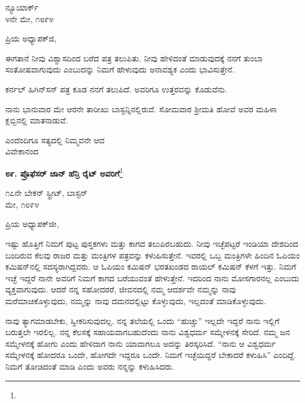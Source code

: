 \begin{flushright}
ನ್ಯೂಯಾರ್ಕ್\\೪ನೇ ಮೇ, ೧೮೯೪
\end{flushright}
\vspace{-0.5cm}

\noindent
ಪ್ರಿಯ ಅಧ್ಯಾಪಕ್‌ಜಿ,

ಈಗತಾನೆ ನೀವು ವಿಶ್ವಾಸದಿಂದ ಬರೆದ ಪತ್ರ ತಲುಪಿತು. ನೀವು ಹೇಳಿದಂತೆ ಮಾಡುವುದಕ್ಕೆ ನನಗೆ ತುಂಬಾ ಸಂತೋಷವಾಗುವುದು ಎಂಬುದನ್ನು ನಿಮಗೆ ಹೇಳುವುದು ಅನಾವಶ್ಯಕ ಎಂದು ಭಾವಿಸುತ್ತೇನೆ.

ಕರ್ನಲ್ ಹಿಗಿನ್‌ಸನ್ ಪತ್ರ ಕೂಡ ನನಗೆ ತಲುಪಿದೆ. ಅವರಿಗೂ ಉತ್ತರವನ್ನು ಕೊಡುವೆನು.

ನಾನು ಭಾನುವಾರ ಮೇ ಆರನೇ ತಾರೀಖು ಬಾಸ್ಟನ್ನಿನಲ್ಲಿರುವೆ. ಸೋಮವಾರ ಶ‍್ರೀಮತಿ ಹೋವೆ ಅವರ ಮಹಿಳಾ ಕ್ಲಬ್ಬಿನಲ್ಲಿ ಮಾತನಾಡುವೆ.

{\flushright
ಎಂದೆಂದಿಗೂ ಸತ್ಯದಲ್ಲಿ ನಿಮ್ಮವನೇ ಆದ\\ವಿವೇಕಾನಂದ\par}

\begin{center}
\textbf{೮೯. ಪ್ರೊಫೆಸರ್ ಜಾನ್ ಹೆನ್ರಿ ರೈಟ್ ಅವರಿಗೆ}\footnote{}
\end{center}
\vspace{-0.4cm}

\begin{flushright}
೧೭ನೇ ಬೇಕನ್ ಸ್ಟ್ರೀಟ್, ಬಾಸ್ಟನ್\\ಮೇ, ೧೮೯೪
\end{flushright}
\vspace{-0.4cm}

\noindent
ಪ್ರಿಯ ಅಧ್ಯಾಪಕ್‌ಜೀ,

ಇಷ್ಟು ಹೊತ್ತಿಗೆ ನಿಮಗೆ ಪುಟ್ಟ ಪುಸ್ತಕಗಳು ಮತ್ತು ಕಾಗದ ತಲುಪಿರಬಹುದು. ನೀವು ಇಚ್ಛೆಪಟ್ಟರೆ ಇಂಡಿಯಾ ದೇಶದಿಂದ ಬಂದಿರುವ ಕೆಲವು ರಾಜರ ಮತ್ತು ಮಂತ್ರಿಗಳ ಪತ್ರವನ್ನು ಕಳುಹಿಸುತ್ತೇನೆ. ಇವರಲ್ಲಿ ಒಬ್ಬ ಮಂತ್ರಿಗಳೇ ಹಿಂದಿನ ಓಪಿಯಂ ಕಮಿಷನ್‌ನಲ್ಲಿ ಸದಸ್ಯರಾಗಿದ್ದವರು. ಆ ಓಪಿಯಂ ಕಮಿಷನ್ ಭರತಖಂಡದ ರಾಯಲ್ ಕಮಿಷನ್ ಕೆಳಗೆ ಇತ್ತು. ನಿಮಗೆ ಇಚ್ಛೆ ಇದ್ದರೆ ನಾನೇ ಅವರಿಗೆ ನಿಮಗೆ ಕಾಗದ ಬರೆಯುವಂತೆ ಹೇಳುತ್ತೇನೆ. ಇದರಿಂದ ನಾನು ಮೋಸಗಾರನಲ್ಲ ಎಂಬುದು ವ್ಯಕ್ತವಾಗುವುದು. ಆದರೆ ನನ್ನ ಸಹೋದರರೆ, ಜೀವನದಲ್ಲಿ ನಮ್ಮ ಆದರ್ಶವೇ ನಮ್ಮನ್ನು ನಾವು ಮರೆಮಾಚಿಕೊಳ್ಳುವುದು, ನಮ್ಮನ್ನು ನಾವು ದಮನದಲ್ಲಿಟ್ಟು ಕೊಳ್ಳುವುದು, ಇಲ್ಲದಂತೆ ಮಾಡಿಕೊಳ್ಳುವುದು.

ನಾವು ತ್ಯಾಗಮಾಡಬೇಕು, ಸ್ವೀಕರಿಸುವುದಲ್ಲ. ನನ್ನ ತಲೆಯಲ್ಲಿ ಒಂದು “ಹುಚ್ಚು” ಇಲ್ಲದೇ ಇದ್ದರೆ ನಾನು ಇಲ್ಲಿಗೆ ಬರುತ್ತಲೇ ಇರಲಿಲ್ಲ. ನನ್ನ ಕೆಲಸಕ್ಕೆ ಸಹಾಯವಾಗಬಹುದೆಂದು ನಾನು ವಿಶ್ವಧರ್ಮ ಸಮ್ಮೇಳನಕ್ಕೆ ಸೇರಿದೆ. ನಮ್ಮ ಜನ ಸಮ್ಮೇಳನಕ್ಕೆ ಹೋಗು ಎಂದು ಹೇಳಿದಾಗ ನಾನು ಯಾವಾಗಲೂ ಅದನ್ನು ತಿರಸ್ಕರಿಸಿದೆ. “ನಾನು ಆ ವಿಶ್ವಧರ್ಮ ಸಮ್ಮೇಳನಕ್ಕೆ ಹೋದರೂ ಒಂದೇ, ಹೋಗದೇ ಇದ್ದರೂ ಒಂದೇ. ನಿಮಗೆ ಇಚ್ಛೆಯಿದ್ದರೆ ಬೇಕಾದರೆ ಕಳುಹಿಸಿ” ಎಂದಿದ್ದೆ. ನಿಮಗೆ ತೋಚಿದಂತೆ ಮಾಡಿ ಎಂದು ಅವರು ನನ್ನನ್ನು ಕಳುಹಿಸಿದರು.


